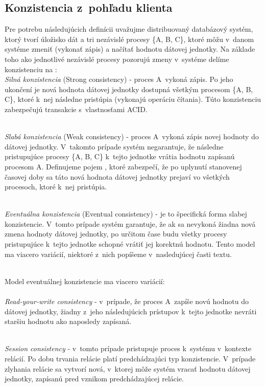 \documentclass[11pt,twoside,a4paper]{book}
\begin{document}
\subsection{Konzistencia z~pohľadu klienta}

Pre potrebu následujúcich definícii uvažujme distribuovaný databázový systém, ktorý tvorí úložisko dát a tri nezávislé procesy \{A, B, C\}, ktoré môžu v~danom systéme zmeniť (vykonať zápis) a načítať hodnotu dátovej jednotky. Na základe toho ako jednotlivé nezávislé procesy pozorujú zmeny v~systéme delíme konzistenciu  na \cite{vogels2009eventually}: \\

\noindent 
\emph{Silná konzistencia} (Strong consistency) - proces A~vykoná zápis. Po jeho ukončení je nová hodnota dátovej jednotky dostupná všetkým procesom \{A, B, C\}, ktoré k~nej následne pristúpia (vykonajú operáciu čítania). Túto konzistenciu zabezpečujú transakcie s~vlastnosťami ACID.

\noindent 
\\
\emph{Slabá konzistencia} (Weak consistency) - proces A~vykoná zápis novej hodnoty do dátovej jednotky. V~takomto prípade systém negarantuje, že následne pristupujúce procesy \{A, B, C\} k~tejto jednotke vrátia hodnotu zapísanú procesom A. Definujeme pojem , ktoré zabezpečí, že po uplynutí stanovenej časovej doby sa táto nová hodnota dátovej jednotky prejaví vo všetkých procesoch, ktoré k~nej pristúpia.

\noindent 
\\
\emph{Eventuálna konzistencia} (Eventual consistency) - je to špecifická forma slabej konzistencie. V~tomto prípade systém garantuje, že ak sa nevykoná žiadna nová zmena hodnoty dátovej jednotky, po určitom čase budu všetky procesy pristupujúce k~tejto jednotke schopné vrátiť jej korektnú hodnotu. Tento model ma viacero variácií, niektoré z~nich popíšeme v~nasledujúcej časti textu.

\noindent 
\\
Model eventuálnej konzistencie ma viacero variácií:\\
\noindent 
\\
\emph{Read-your-write consistency} - v~prípade, že proces A~zapíše novú hodnotu do dátovej jednotky, žiadny z~jeho následujúcich prístupov k~tejto jednotke nevráti staršiu hodnotu ako naposledy zapísaná.

\noindent
\\
\emph{Session consistency} - v~tomto prípade pristupuje proces k~systému v~kontexte relácií. Po dobu trvania relácie platí predchádzajúci typ konzistencie. V~prípade zlyhania relácie sa vytvorí nová, v~ktorej môže systém vracať hodnotu dátovej jednotky, zapísanú pred vznikom predchádzajúcej relácie.
\end{document}
